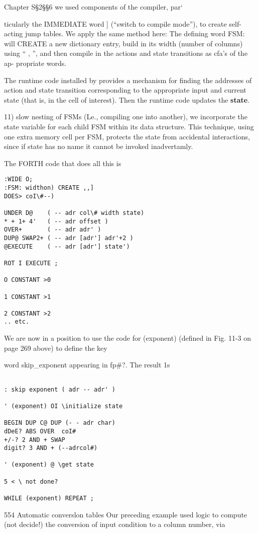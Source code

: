  Chapter S§2§§6 we used components of the compiler, par‘

ticularly the IMMEDIATE word ] (“switch to compile mode”),
to create self-acting jump tables. We apply the same method here:
The defining word FSM: will CREATE a new dictionary entry,
build in its width (number of columns) using “ , ”, and then
compile in the actions and state transitions as cfa’s of the ap-
propriate words.

The runtime code installed by  provides a mechanism for finding the addresses of action and state transition corresponding to the appropriate input and current state (that is, in the cell of interest). Then the runtime code updates the \textbf{state}.

11) slow nesting of FSMs (Le., compiling one into another), we
incorporate the state variable for each child FSM within its data
structure. This technique, using one extra memory cell per FSM,
protects the state from accidental interactions, since if state has
no name it cannot be invoked inadvertamly.

The FORTH code that does all this is
\begin{verbatim}
:WIDE O;
:FSM: widthon) CREATE ,,]
DOES> coI\#--)

UNDER D@    ( -- adr col\# width state)
* + 1+ 4'   ( -- adr offset )
OVER+       ( -- adr adr' )
DUP@ SWAP2+ ( -- adr [adr'] adr'+2 )
@EXECUTE    ( -- adr [adr'] state')

ROT I EXECUTE ;

O CONSTANT >0

1 CONSTANT >1

2 CONSTANT >2
.. etc.

\end{verbatim}

We are now in a position to use the code for (exponent)
(defined in Fig. 11-3 on page 269 above) to define the key

word skip\_exponent appearing in fp\#?. The result 1s

\begin{verbatim}

: skip exponent ( adr -- adr' )

' (exponent) OI \initialize state

BEGIN DUP C@ DUP (- - adr char)
dDeE? ABS OVER  coI#
+/-? 2 AND + SWAP
digit? 3 AND + (--adrcol#)

' (exponent) @ \get state

5 < \ not done?

WHILE (exponent) REPEAT ;
\end{verbatim}
554 Automatic converslon tables
Our preceding example used logic to compute (not decide!) the
conversion of input condition to a column number, via


